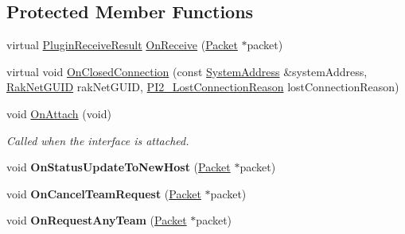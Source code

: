 \subsection*{Protected Member Functions}
\begin{DoxyCompactItemize}
\item 
virtual \hyperlink{group___p_l_u_g_i_n___i_n_t_e_r_f_a_c_e___g_r_o_u_p_ga89998adaafb29e5d879113b992161085}{Plugin\-Receive\-Result} \hyperlink{class_rak_net_1_1_team_balancer_a1e3c779240545e2608f39c0fdfda802b}{On\-Receive} (\hyperlink{struct_rak_net_1_1_packet}{Packet} $\ast$packet)
\item 
virtual void \hyperlink{class_rak_net_1_1_team_balancer_a62bd3dd9ccf001df5627664b2c134cf5}{On\-Closed\-Connection} (const \hyperlink{struct_rak_net_1_1_system_address}{System\-Address} \&system\-Address, \hyperlink{struct_rak_net_1_1_rak_net_g_u_i_d}{Rak\-Net\-G\-U\-I\-D} rak\-Net\-G\-U\-I\-D, \hyperlink{group___p_l_u_g_i_n___i_n_t_e_r_f_a_c_e___g_r_o_u_p_ga376cc546fd6892c2ead48cd51796c8b8}{P\-I2\-\_\-\-Lost\-Connection\-Reason} lost\-Connection\-Reason)
\item 
\hypertarget{class_rak_net_1_1_team_balancer_a95eadc29d0574cd4cf35de9d072fed23}{void \hyperlink{class_rak_net_1_1_team_balancer_a95eadc29d0574cd4cf35de9d072fed23}{On\-Attach} (void)}\label{class_rak_net_1_1_team_balancer_a95eadc29d0574cd4cf35de9d072fed23}

\begin{DoxyCompactList}\small\item\em Called when the interface is attached. \end{DoxyCompactList}\item 
\hypertarget{class_rak_net_1_1_team_balancer_a76f7a40c96edd80ef8c59a0fb16df692}{void {\bfseries On\-Status\-Update\-To\-New\-Host} (\hyperlink{struct_rak_net_1_1_packet}{Packet} $\ast$packet)}\label{class_rak_net_1_1_team_balancer_a76f7a40c96edd80ef8c59a0fb16df692}

\item 
\hypertarget{class_rak_net_1_1_team_balancer_a44648e94f6cc0b939d9859e3874934ab}{void {\bfseries On\-Cancel\-Team\-Request} (\hyperlink{struct_rak_net_1_1_packet}{Packet} $\ast$packet)}\label{class_rak_net_1_1_team_balancer_a44648e94f6cc0b939d9859e3874934ab}

\item 
\hypertarget{class_rak_net_1_1_team_balancer_a816ba24e4a9d26fd236bc5b9e4e20193}{void {\bfseries On\-Request\-Any\-Team} (\hyperlink{struct_rak_net_1_1_packet}{Packet} $\ast$packet)}\label{class_rak_net_1_1_team_balancer_a816ba24e4a9d26fd236bc5b9e4e20193}


\end{DoxyCompactItemize}
